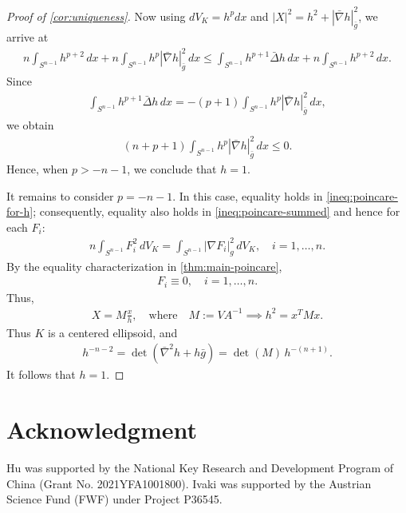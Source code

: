 \documentclass[12pt]{amsart}
\newcommand{\Sn}{S^{n-1}}
\newcommand{\abs}[1]{\left|#1\right|}
\newcommand{\eq}[1]{\begin{equation}\begin{alignedat}{2}#1\end{alignedat}\end{equation}}
\theoremstyle{plain}
\theoremstyle{definition}
\theoremstyle{remark}
\numberwithin{equation}{section}
\begin{document}
\begin{proof}[Proof of \autoref{cor:uniqueness}]
Now using $dV_K=h^pdx$ and $\abs{X}^2=h^2+\abs{\bar{\nabla} h}_{\bar{g}}^2$, we arrive at
\eq{\label{ineq:poincare-for-h}
n\int_{\Sn}h^{p+2}\,dx+n\int_{\Sn}h^p\abs{\bar{\nabla} h}_{\bar{g}}^2\,dx\le \int_{\Sn}h^{p+1}\bar{\Delta} h\,dx+n\int_{\Sn}h^{p+2}\,dx.
}
Since
\eq{
\int_{\Sn}h^{p+1}\bar{\Delta} h\,dx=-(p+1)\int_{\Sn}h^p\abs{\bar{\nabla} h}_{\bar{g}}^2\,dx,
}
we obtain
\eq{
(n+p+1)\int_{\Sn}h^p\abs{\bar{\nabla} h}_{\bar{g}}^2\,dx\le0.
}
Hence, when $p>-n-1$, we conclude that $h=1$.

It remains to consider $p=-n-1$. In this case, equality holds in  \eqref{ineq:poincare-for-h}; consequently, equality also holds in \eqref{ineq:poincare-summed} and hence for each $F_i$:
\eq{
n\int_{\Sn}F_i^2\,dV_K
=\int_{\Sn}\abs{\nabla F_i}_g^2\,dV_K,\quad i=1,\ldots,n.
}
By the equality characterization in \autoref{thm:main-poincare},
\eq{
F_i\equiv 0,\quad i=1,\ldots,n.
}
Thus,
\eq{
X=M\frac{x}{h},\quad \text{where}\quad M:=VA^{-1}\implies h^2=x^TMx.
}
Thus $K$ is a centered ellipsoid, and
\eq{
h^{-n-2}=\det\left(\bar{\nabla}^2h+h\bar{g}\right)=\det(M)\,h^{-(n+1)}.
}
It follows that $h=1$.
\end{proof}

\section*{Acknowledgment}
Hu was supported by the National Key Research and Development Program of China (Grant No. 2021YFA1001800). Ivaki was supported by the Austrian Science Fund (FWF) under Project P36545.
\end{document}

